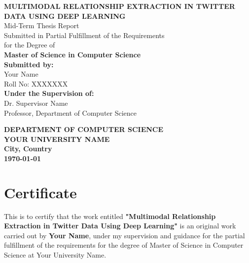 \documentclass[12pt,a4paper]{report}
\begin{document}
\begin{titlepage}
    \centering
    \vspace*{1cm}
    
    {\LARGE\textbf{MULTIMODAL RELATIONSHIP EXTRACTION IN TWITTER DATA USING DEEP LEARNING}}\\[1.5cm]
    
    {\Large Mid-Term Thesis Report}\\[0.5cm]
    {\large Submitted in Partial Fulfillment of the Requirements}\\
    {\large for the Degree of}\\[0.5cm]
    {\Large\textbf{Master of Science in Computer Science}}\\[2cm]
    
    {\large \textbf{Submitted by:}}\\[0.3cm]
    {\Large Your Name}\\
    {\large Roll No: XXXXXXX}\\[2cm]
    
    {\large \textbf{Under the Supervision of:}}\\[0.3cm]
    {\Large Dr. Supervisor Name}\\
    {\large Professor, Department of Computer Science}\\[2cm]
    
    \vfill
    
    {\large\textbf{DEPARTMENT OF COMPUTER SCIENCE}}\\
    {\large\textbf{YOUR UNIVERSITY NAME}}\\
    {\large\textbf{City, Country}}\\[0.5cm]
    {\large\textbf{\today}}
    
\end{titlepage}

\chapter*{Certificate}
\thispagestyle{empty}
This is to certify that the work entitled \textbf{"Multimodal Relationship Extraction in Twitter Data Using Deep Learning"} is an original work carried out by \textbf{Your Name}, under my supervision and guidance for the partial fulfillment of the requirements for the degree of Master of Science in Computer Science at Your University Name.
\end{document}
